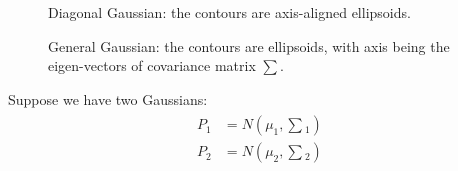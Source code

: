 \begin{figure}[h]
	\caption{Diagonal Gaussian: the contours are axis-aligned ellipsoids.}
\end{figure}


\begin{figure}[h]
	\caption{General Gaussian: the contours are ellipsoids, with axis being the eigen-vectors
		of covariance matrix $\sum$.}
\end{figure}

Suppose we have two Gaussians:
\begin{align}
\begin{split}
	P_1 &= N(\mu_1, \sum{}_1) \\
	P_2 &= N(\mu_2, \sum{}_2)
\end{split}
\end{align}

